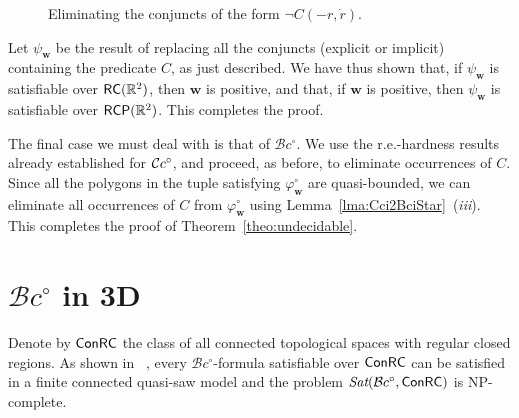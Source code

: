 \documentclass{article}
\newcommand{\NP}{\textsc{NP}}
\newcommand{\Sat}{\textit{Sat}}
\newcommand{\cBci}{\ensuremath{\mathcal{B}c^\circ}}
\newcommand{\R}{\mathbb{R}}
\newcommand{\RC}{{\sf RC}}
\newcommand{\RCP}{{\sf RCP}}
\newcommand{\fW}{\mathbf{w}}
\newcommand{\ti}[2][]{{#2}^{\circ_{#1}}}
\newcommand{\intermediate}[1]{\dot{#1}}
\renewcommand{\phi}{\varphi}
\begin{document}
\begin{figure}[h]
\begin{center}
{{
	}
	}
	\end{center}
	\caption{Eliminating the conjuncts of the form $\lnot C(-r,\intermediate{r})$.} 
	\label{fig:crenellate}
\end{figure}
Let $\psi_\fW$ be the result of replacing all the conjuncts (explicit
or implicit) containing the predicate $C$, as just described. We have
thus shown that, if $\psi_\fW$ is satisfiable over $\RC(\R^2)$, then
$\fW$ is positive, and that, if $\fW$ is positive, then $\psi_\fW$ is
satisfiable over $\RCP(\R^2)$. This completes the proof.

The final case we must deal with is that of $\cBci$. We use the
r.e.-hardness results already established for $\mathcal{C}c^\circ$, and proceed,
as before, to eliminate occurrences of $C$. Since all the polygons in 
the tuple satisfying $\ti{\phi}_\fW$ are quasi-bounded, we can eliminate 
all occurrences of $C$ from $\ti{\phi}_\fW$ using 
Lemma~\ref{lma:Cci2BciStar}~(\emph{iii}). This completes the proof of 
Theorem~\ref{theo:undecidable}.




\section{$\cBci$ in 3D}\label{sec:Bci3D_C}

\newcommand{\ConRC}{{\sf ConRC}}


Denote by $\ConRC$ the class of all connected topological spaces with regular closed regions. As shown in ~\cite{ijcai:kphz10}, every $\cBci$-formula satisfiable over $\ConRC$ can be satisfied in a finite connected quasi-saw model and the problem $\Sat(\cBci,\ConRC)$ is \NP-complete.
\end{document}
